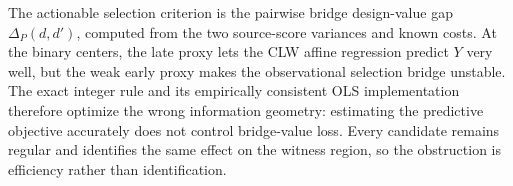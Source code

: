The actionable selection criterion is the pairwise bridge design-value gap \(\Delta_P(d,d')\), computed from the two source-score variances and known costs.  At the binary centers, the late proxy lets the CLW affine regression predict \(Y\) very well, but the weak early proxy makes the observational selection bridge unstable.  The exact integer rule and its empirically consistent OLS implementation therefore optimize the wrong information geometry: estimating the predictive objective accurately does not control bridge-value loss.  Every candidate remains regular and identifies the same effect on the witness region, so the obstruction is efficiency rather than identification.